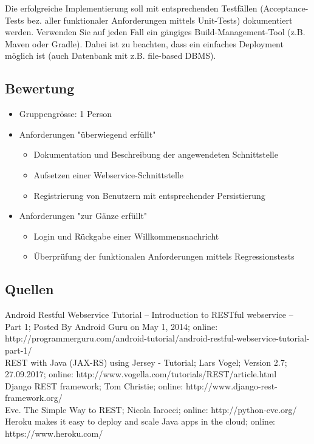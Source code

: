 Die erfolgreiche Implementierung soll mit entsprechenden Testfällen (Acceptance-Tests bez. aller funktionaler Anforderungen mittels Unit-Tests) dokumentiert werden. Verwenden Sie auf jeden Fall ein gängiges Build-Management-Tool (z.B. Maven oder Gradle). Dabei ist zu beachten, dass ein einfaches Deployment möglich ist (auch Datenbank mit z.B. file-based DBMS).

\clearpage

\subsection{Bewertung}
\begin{itemize}
	\item Gruppengrösse: 1 Person
	\item Anforderungen "überwiegend erfüllt"
	\begin{itemize}
		\item Dokumentation und Beschreibung der angewendeten Schnittstelle
		\item Aufsetzen einer Webservice-Schnittstelle
		\item Registrierung von Benutzern mit entsprechender Persistierung
	\end{itemize}
	\item Anforderungen "zur Gänze erfüllt"
	\begin{itemize}
		\item Login und Rückgabe einer Willkommensnachricht
		\item Überprüfung der funktionalen Anforderungen mittels Regressionstests
	\end{itemize}
\end{itemize}

\subsection{Quellen}
\glqq Android Restful Webservice Tutorial – Introduction to RESTful webservice – Part 1\grqq ; Posted By Android Guru on May 1, 2014; online: http://programmerguru.com/android-tutorial/android-restful-webservice-tutorial-part-1/ \\
\glqq REST with Java (JAX-RS) using Jersey - Tutorial\grqq; Lars Vogel; Version 2.7; 27.09.2017; online: http://www.vogella.com/tutorials/REST/article.html \\
\glqq Django REST framework\grqq; Tom Christie; online: http://www.django-rest-framework.org/ \\
\glqq Eve. The Simple Way to REST\grqq; Nicola Iarocci; online: http://python-eve.org/ \\
\glqq Heroku makes it easy to deploy and scale Java apps in the cloud\grqq; online: https://www.heroku.com/
\clearpage
